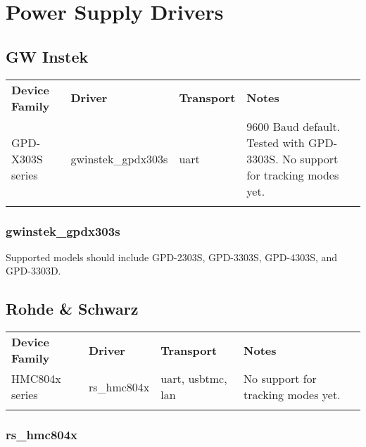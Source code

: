 \chapter{Power Supply Drivers}
\label{sec:powersupply-drivers}

\section{GW Instek}

\begin{tabularx}{16cm}{lllX}
\thickhline
\textbf{Device Family} & \textbf{Driver} & \textbf{Transport} & \textbf{Notes} \\
\thickhline
GPD-X303S series & gwinstek_gpdx303s & uart & 9600 Baud default. Tested with GPD-3303S. No support for tracking modes yet.\\
\thickhline
\end{tabularx}

\subsection{gwinstek_gpdx303s}

Supported models should include GPD-2303S, GPD-3303S, GPD-4303S, and GPD-3303D.

\section{Rohde & Schwarz}

\begin{tabularx}{16cm}{lllX}
\thickhline
\textbf{Device Family} & \textbf{Driver} & \textbf{Transport} & \textbf{Notes} \\
\thickhline
HMC804x series & rs_hmc804x & uart, usbtmc, lan & No support for tracking modes yet.\\
\thickhline
\end{tabularx}

\subsection{rs_hmc804x}

